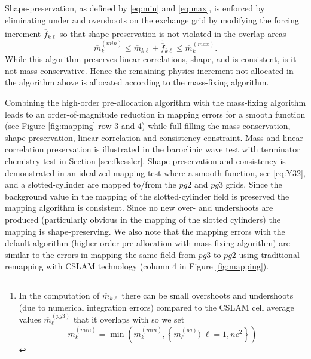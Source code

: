 Shape-preservation, as defined by \eqref{eq:min} and \eqref{eq:max}, is enforced by eliminating under and overshoots on the exchange grid by modifying the forcing increment $\overline{f}_{k\ell}$ so that shape-preservation is not violated in the overlap areas{\footnote{In the computation of $\overline{m}_{k\ell}$ there can be small overshoots and undershoots (due to numerical integration errors) compared to the CSLAM cell average values $\overline{m}^{(pg3)}_\ell$ that it overlaps with so we set
\begin{equation}
\overline{m}_k^{(min)}=\min \left( \overline{m}_k^{(min)},\left\{ \overline{m}^{(pg)}_\ell)|\ell=1,nc^2\right\} \right)
\end{equation}}}
\begin{equation}
\overline{m}_k^{(min)} \le \overline{m}_{k\ell}+\widetilde{\overline{f}}_{k\ell} \le \overline{m}_k^{(max)}.
\end{equation}
While this algorithm preserves linear correlations, shape, and is consistent, is it not mass-conservative. Hence the remaining physics increment not allocated in the algorithm above is allocated according to the mass-fixing algorithm.

Combining the high-order pre-allocation algorithm with the mass-fixing algorithm leads to an order-of-magnitude reduction in mapping errors for a smooth function (see Figure \ref{fig:mapping} row 3 and 4) while full-filling the mass-conservation, shape-preservation, linear correlation and consistency  constraint. Mass and linear correlation preservation is illustrated in the baroclinic wave test with terminator chemistry test in Section \ref{sec:fkessler}. Shape-preservation and consistency is demonstrated in an idealized mapping test where a smooth function, see \eqref{eq:Y32}, and a slotted-cylinder \citep[see equation 12 in ][]{LSPT2012GMD} are mapped to/from the $pg2$ and $pg3$ grids. Since the background value in the mapping of the slotted-cylinder field is preserved the mapping algorithm is consistent. Since no new over- and undershoots are produced (particularly obvious in the mapping of the slotted cylinders) the mapping is shape-preserving. We also note that the mapping errors with the default algorithm (higher-order pre-allocation with mass-fixing algorithm) are similar to the errors in mapping the same field from $pg3$ to $pg2$ using traditional remapping with CSLAM technology (column 4 in Figure \ref{fig:mapping}).


